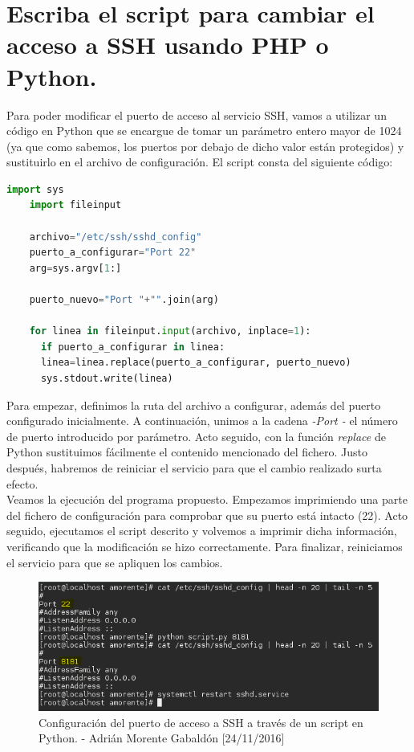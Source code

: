 \section{Escriba el script para cambiar el acceso a SSH usando PHP o Python.}
Para poder modificar el puerto de acceso al servicio SSH, vamos a utilizar un código en Python que se encargue de tomar un parámetro entero mayor de 1024 (ya que como sabemos, los puertos por debajo de dicho valor están protegidos) y sustituirlo en el archivo de configuración. El script consta del siguiente código:
\begin{lstlisting}[language=python]
	import sys
	import fileinput
	
	archivo="/etc/ssh/sshd_config"
	puerto_a_configurar="Port 22"
	arg=sys.argv[1:]
	
	puerto_nuevo="Port "+"".join(arg)
	
	for linea in fileinput.input(archivo, inplace=1):
	  if puerto_a_configurar in linea:
	  linea=linea.replace(puerto_a_configurar, puerto_nuevo)
	  sys.stdout.write(linea)
\end{lstlisting}
Para empezar, definimos la ruta del archivo a configurar, además del puerto configurado inicialmente. A continuación, unimos a la cadena \emph{-Port -} el número de puerto introducido por parámetro. Acto seguido, con la función \emph{replace} de Python sustituimos fácilmente el contenido mencionado del fichero. Justo después, habremos de reiniciar el servicio para que el cambio realizado surta efecto. \\
Veamos la ejecución del programa propuesto. Empezamos imprimiendo una parte del fichero de configuración para comprobar que su puerto está intacto (22). Acto seguido, ejecutamos el script descrito y volvemos a imprimir dicha información, verificando que la modificación se hizo correctamente. Para finalizar, reiniciamos el servicio para que se apliquen los cambios.
\begin{figure}[H]
	\centering
	\includegraphics[scale=0.75]{ssh-python}
	\caption{Configuración del puerto de acceso a SSH a través de un script en Python. - Adrián Morente Gabaldón [24/11/2016]}
	\label{fig:figura20}
\end{figure}


